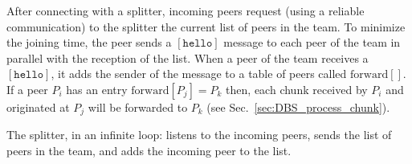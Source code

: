 
\label{sec:joining}

After connecting with a splitter, incoming peers request (using a
reliable communication) to the splitter the current list of peers in
the team. To minimize the joining time, the peer sends a
$[\mathtt{hello}]$ message to each peer of the team in parallel
with the reception of the list. When a peer of the team receives a
$[\mathtt{hello}]$, it adds the sender of the message to a table of peers
called $\text{forward}[]$. If a peer $P_i$ has an entry
$\text{forward}[P_j]=P_k$ then, each chunk received by $P_i$ and
originated at $P_j$ will be forwarded to $P_k$ (see
Sec.~\ref{sec:DBS_process_chunk}).


The splitter, in an infinite loop: listens to the incoming peers,
sends the list of peers in the team, and adds the incoming peer to the
list.

\begin{comment}
\begin{figure*}
  \fig{1000}{10cm}{joining} \caption{Code related to team
    joining.\label{fig:joining}}
\end{figure*}

The new pseudo-code related to joining a team is describen in the
Fig.~\ref{fig:joining}.
\end{comment}
